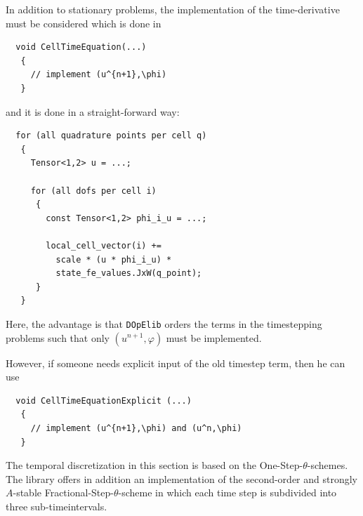 \documentclass[prodmode,acmtoms]{acmsmall}
\numberwithin{equation}{section}
\renewcommand{\phi}{\varphi}
\newcommand{\dope}{\texttt{DOpElib}}
\begin{document}
In addition to stationary problems, the implementation
of the time-derivative must be considered which is done
in 
\begin{lstlisting}
  void CellTimeEquation(...)
   {
     // implement (u^{n+1},\phi) 
   }
\end{lstlisting}
and it is done in a straight-forward way:
\begin{lstlisting}
  for (all quadrature points per cell q)
   {
     Tensor<1,2> u = ...;

     for (all dofs per cell i)
      {
        const Tensor<1,2> phi_i_u = ...;

        local_cell_vector(i) +=  
          scale * (u * phi_i_u) * 
          state_fe_values.JxW(q_point);
      }
   }
\end{lstlisting}
Here, the advantage is that \dope{} orders the terms in the timestepping
problems
such that only $(u^{n+1},\phi)$ must be implemented. 



\begin{remark}
However, if someone 
needs explicit input of the old timestep term, then he can use 
\begin{lstlisting}
  void CellTimeEquationExplicit (...)
   {
     // implement (u^{n+1},\phi) and (u^n,\phi)  
   }
\end{lstlisting}
\end{remark}

\begin{remark}
The temporal discretization in this section 
is based on the One-Step-$\theta$-schemes. The library
offers in addition an implementation 
of the second-order and strongly $A$-stable 
Fractional-Step-$\theta$-scheme in which 
each time step is subdivided into three 
sub-timeintervals. 
\end{remark}
\end{document}
